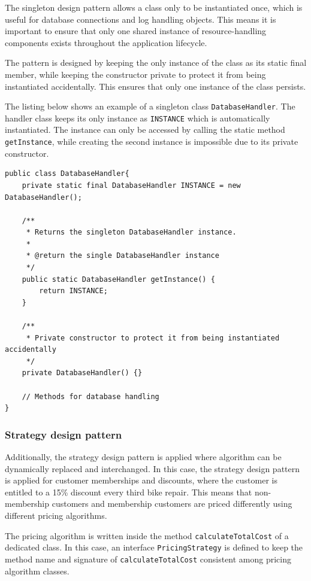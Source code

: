 \documentclass[a4paper]{scrartcl}
\begin{document}
The singleton design pattern allows a class only to be instantiated once, which is useful for database connections and log handling objects. This means it is important to ensure that only one shared instance of resource-handling components exists throughout the application lifecycle.

The pattern is designed by keeping the only instance of the class as its static final member, while keeping the constructor private to protect it from being instantiated accidentally. This ensures that only one instance of the class persists.

The listing below shows an example of a singleton class \texttt{DatabaseHandler}. The handler class keeps its only instance as \texttt{INSTANCE} which is automatically instantiated. The instance can only be accessed by calling the static method \texttt{getInstance}, while creating the second instance is impossible due to its private constructor.

\begin{lstlisting}[style=javastyle, caption={\texttt{DatabaseHandler} implementation with singleton}]
public class DatabaseHandler{
    private static final DatabaseHandler INSTANCE = new DatabaseHandler();

    /**
     * Returns the singleton DatabaseHandler instance.
     *
     * @return the single DatabaseHandler instance
     */
    public static DatabaseHandler getInstance() {
        return INSTANCE;
    }

    /**
     * Private constructor to protect it from being instantiated accidentally
     */
    private DatabaseHandler() {}

    // Methods for database handling
}
\end{lstlisting}

\subsubsection{Strategy design pattern}
Additionally, the strategy design pattern is applied where algorithm can be dynamically replaced and interchanged. In this case, the strategy design pattern is applied for customer memberships and discounts, where the customer is entitled to a 15\% discount every third bike repair. This means that non-membership customers and membership customers are priced differently using different pricing algorithms.

The pricing algorithm is written inside the method \texttt{calculateTotalCost} of a dedicated class. In this case, an interface \texttt{PricingStrategy} is defined to keep the method name and signature of \texttt{calculateTotalCost} consistent among pricing algorithm classes.
\end{document}

